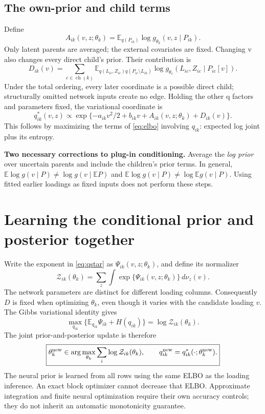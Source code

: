 \documentclass[11pt,a4paper]{article}
\newcommand{\E}{\mathbb E}
\newcommand{\ch}{\operatorname{ch}}
\newcommand{\note}[1]{\par\smallskip\noindent\colorbox{blue!5}{\parbox{\dimexpr\linewidth-2\fboxsep\relax}{#1}}\par\smallskip}
\begin{document}
\subsection{The own-prior and child terms}
Define
\begin{equation}
A_{ik}(v,z;\theta_k)=
\E_{q(P_{ik})}\log g_{\theta_k}(v,z\mid P_{ik}).
\label{eq:own}
\end{equation}
Only latent parents are averaged; the external covariates are fixed.
Changing v also changes every direct child's prior. Their contribution is
\begin{equation}
D_{ik}(v)=\sum_{c\in\ch(k)}
\E_{q(L_{ic},Z_{ic})q(P_{ic}\setminus L_{ik})}
\log g_{\theta_c}(L_{ic},Z_{ic}\mid P_{ic}[v]).
\label{eq:child}
\end{equation}
Under the total ordering, every later coordinate is a possible direct
child; structurally omitted network inputs create no edge. Holding the
other q factors and parameters fixed, the variational coordinate is
\begin{equation}
\boxed{q^*_{ik}(v,z)\propto
\exp\{-a_{ik}v^2/2+b_{ik}v+A_{ik}(v,z;\theta_k)+D_{ik}(v)\}.}
\label{eq:qstar}
\end{equation}
This follows by maximizing the terms of \eqref{eq:elbo} involving \(q_{ik}\):
expected log joint plus its entropy.

\note{\textbf{Two necessary corrections to plug-in conditioning.}
Average the \emph{log prior} over uncertain parents and include the
children's prior terms. In general,
\(\E\log g(v\mid P)\ne\log g(v\mid\E P)\) and
\(\E\log g(v\mid P)\ne\log\E g(v\mid P)\).
Using fitted earlier loadings as fixed inputs does not perform these steps.}

\clearpage
\section{Learning the conditional prior and posterior together}
Write the exponent in \eqref{eq:qstar} as
\(\Psi_{ik}(v,z;\theta_k)\), and define its normalizer
\begin{equation}
\mathcal Z_{ik}(\theta_k)=\sum_z\int
\exp\{\Psi_{ik}(v,z;\theta_k)\}\,d\nu_z(v).
\label{eq:normalizer}
\end{equation}
The network parameters are distinct for different loading columns.
Consequently \(D\) is fixed when optimizing \(\theta_k\), even though it varies
with the candidate loading \(v\). The Gibbs variational identity gives
\begin{equation}
\max_{q_{ik}}\{\E_{q_{ik}}\Psi_{ik}+H(q_{ik})\}
=\log\mathcal Z_{ik}(\theta_k).
\label{eq:profile}
\end{equation}
The joint prior-and-posterior update is therefore
\begin{equation}
\boxed{\theta_k^{\rm new}\in\arg\max_{\theta_k}\sum_i\log\mathcal Z_{ik}(\theta_k),
\qquad q_{ik}^{\rm new}=q^*_{ik}(\cdot;\theta_k^{\rm new}).}
\label{eq:learning}
\end{equation}
The neural prior is learned from all rows using the same ELBO as the
loading inference. An exact block optimizer cannot decrease that ELBO.
Approximate integration and finite neural optimization require their own
accuracy controls; they do not inherit an automatic monotonicity guarantee.
\end{document}
